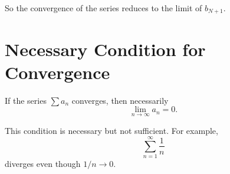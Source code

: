 So the convergence of the series reduces to the limit of $b_{N+1}$.

\section*{Necessary Condition for Convergence}

\begin{theorem}
If the series $\sum a_n$ converges, then necessarily
$$\lim_{n\to\infty} a_n = 0.$$ 
\end{theorem}

\begin{remark}
This condition is necessary but not sufficient. For example,
$$\sum_{n=1}^{\infty} \frac{1}{n}$$
diverges even though $1/n\to 0$.
\end{remark}